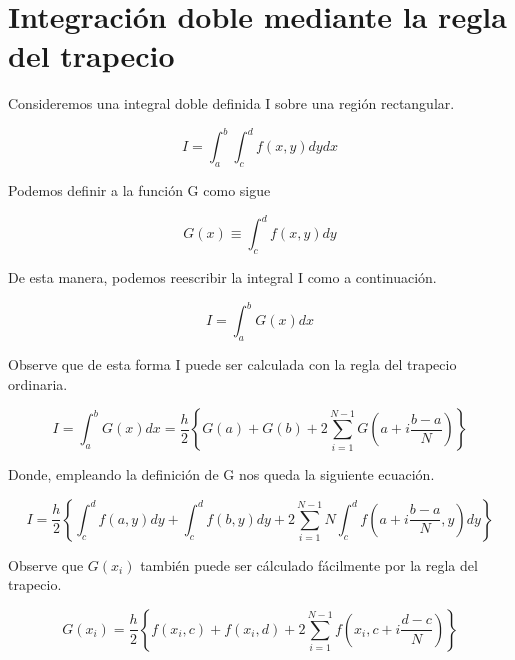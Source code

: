 \section{Integración doble mediante la regla del trapecio}

Consideremos una integral doble definida I sobre una región rectangular.

\begin{equation}
    I = \displaystyle\int_{a}^{b} \displaystyle\int_{c}^{d} 
    f(x,y) dy dx
\end{equation}

Podemos definir a la función G como sigue

\begin{equation}
    G(x) \equiv \displaystyle\int_{c}^{d} f(x,y) dy
\end{equation}

De esta manera, podemos reescribir la integral I como a continuación.

\begin{equation}
    I = \displaystyle\int_{a}^{b} G(x) dx
\end{equation}

Observe que de esta forma I puede ser calculada con la regla del trapecio ordinaria.

\begin{equation} 
    I =
    \displaystyle\int_{a}^{b} G(x) dx = 
    \frac{h}{2} \left\{ 
    G(a) + G(b) + 2\displaystyle\sum_{i=1}^{N-1} G(a + i \frac{b-a}{N})
    \right\}
\end{equation}

Donde, empleando la definición de G nos queda la siguiente ecuación.

\begin{equation} 
    I =
    \frac{h}{2} \left\{ 
        \displaystyle\int_{c}^{d} f(a,y) dy
        + \displaystyle\int_{c}^{d} f(b,y) dy
        + 2\displaystyle\sum_{i=1}^{N-1} {N}\displaystyle\int_{c}^{d} f(a + i \frac{b-a}{N},y) dy
    \right\}
\end{equation}

Observe que $G(x_i)$ también puede ser cálculado fácilmente por la regla del trapecio.

\begin{equation} 
     G(x_i) = 
    \frac{h}{2} \left\{ 
    f(x_i,c) + f(x_i,d) + 2\displaystyle\sum_{i=1}^{N-1} f(x_i, c + i \frac{d-c}{N})
    \right\}
\end{equation}